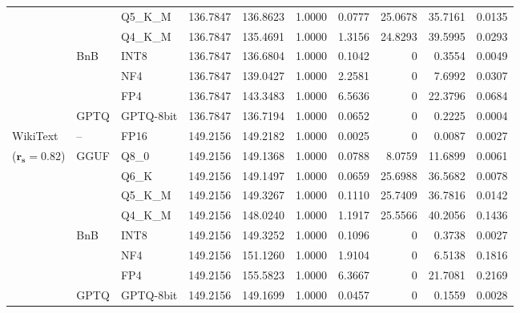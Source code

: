 \begin{longtable}{ll l rrrrrrr}
 &  & Q5\_K\_M & 136.7847 & 136.8623 & 1.0000 & 0.0777 & 25.0678 & 35.7161 & 0.0135 \\
 &  & Q4\_K\_M & 136.7847 & 135.4691 & 1.0000 & 1.3156 & 24.8293 & 39.5995 & 0.0293 \\
 & BnB & INT8 & 136.7847 & 136.6804 & 1.0000 & 0.1042 & \cellcolor{cyan!12} $0$ & 0.3554 & 0.0049 \\
 &  & NF4 & 136.7847 & 139.0427 & 1.0000 & 2.2581 & \cellcolor{cyan!12} $0$ & 7.6992 & 0.0307 \\
 &  & FP4 & 136.7847 & 143.3483 & 1.0000 & 6.5636 & \cellcolor{cyan!12} $0$ & 22.3796 & 0.0684 \\
 & GPTQ & GPTQ-8bit & 136.7847 & 136.7194 & 1.0000 & 0.0652 & \cellcolor{cyan!12} $0$ & 0.2225 & 0.0004 \\
\midrule
WikiText & -- & FP16 & 149.2156 & 149.2182 & 1.0000 & 0.0025 & \cellcolor{cyan!12} $0$ & 0.0087 & 0.0027 \\
{\small ($\mathbf{r_s{=}0.82}$)} & GGUF & Q8\_0 & 149.2156 & 149.1368 & 1.0000 & 0.0788 & 8.0759 & 11.6899 & 0.0061 \\
 &  & Q6\_K & 149.2156 & 149.1497 & 1.0000 & 0.0659 & 25.6988 & 36.5682 & 0.0078 \\
 &  & Q5\_K\_M & 149.2156 & 149.3267 & 1.0000 & 0.1110 & 25.7409 & 36.7816 & 0.0142 \\
 &  & Q4\_K\_M & 149.2156 & 148.0240 & 1.0000 & 1.1917 & 25.5566 & 40.2056 & 0.1436 \\
 & BnB & INT8 & 149.2156 & 149.3252 & 1.0000 & 0.1096 & \cellcolor{cyan!12} $0$ & 0.3738 & 0.0027 \\
 &  & NF4 & 149.2156 & 151.1260 & 1.0000 & 1.9104 & \cellcolor{cyan!12} $0$ & 6.5138 & 0.1816 \\
 &  & FP4 & 149.2156 & 155.5823 & 1.0000 & 6.3667 & \cellcolor{cyan!12} $0$ & 21.7081 & 0.2169 \\
 & GPTQ & GPTQ-8bit & 149.2156 & 149.1699 & 1.0000 & 0.0457 & \cellcolor{cyan!12} $0$ & 0.1559 & 0.0028 \\
\end{longtable}
\endgroup